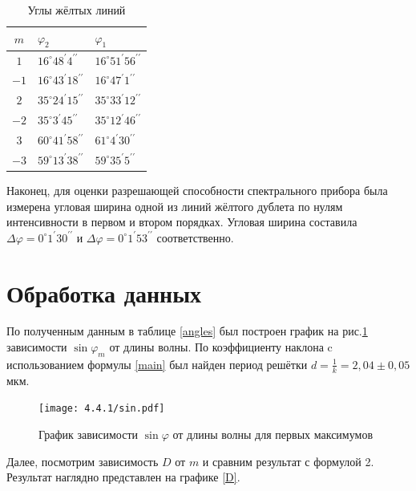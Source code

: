 \documentclass[a4paper,12pt]{article} %
\begin{document}
\begin{table}[H]
    \centering
    \begin{tabular}{|c|p{4cm}|p{4cm}|}
    \hline $m$ & $\varphi_{2}$ & $\varphi_{1}$ \\ \hline
$1$   & $16^{\circ} 48^{\prime}  4^{\prime \prime}$  & $16^{\circ} 51^{\prime} 56^{\prime \prime}$  \\ \hline
$-1$  & $16^{\circ} 43^{\prime} 18^{\prime \prime}$  & $16^{\circ} 47^{\prime} 1^{\prime \prime}$  \\ \hline
$2$   & $35^{\circ} 24^{\prime} 15^{\prime \prime}$  & $35^{\circ} 33^{\prime} 12^{\prime \prime}$  \\ \hline
$-2$  & $35^{\circ}  3^{\prime} 45^{\prime \prime}$  & $35^{\circ} 12^{\prime} 46^{\prime \prime}$  \\ \hline
$3$   & $60^{\circ} 41^{\prime} 58^{\prime \prime}$  & $61^{\circ}  4^{\prime}  30^{\prime \prime}$  \\ \hline
$-3$  & $59^{\circ} 13^{\prime} 38^{\prime \prime}$  & $59^{\circ} 35^{\prime}  5^{\prime \prime}$  \\ \hline
    \end{tabular}
    \caption{Углы жёлтых линий}
    \label{yell}
\end{table}

Наконец, для оценки разрешающей способности спектрального прибора была измерена угловая ширина одной из линий жёлтого дублета по нулям интенсивности в первом и втором порядках. Угловая ширина составила $\Delta \varphi = 0^{\circ} 1^{\prime}  30^{\prime \prime}$ и $ \Delta \varphi = 0^{\circ} 1^{\prime}  53^{\prime \prime}$ соответственно.

\section{Обработка данных}

По полученным данным в таблице \ref{angles} был построен график на рис.\ref{angle} зависимости $\sin \varphi_m$ от длины волны. По коэффициенту наклона c использованием формулы \eqref{main} был найден период решётки $d = \frac{1}{k} = 2,04 \pm 0,05$ мкм.

\begin{figure}[H]
    \centering
    \texttt{[image: 4.4.1/sin.pdf]}
    \caption{График зависимости $\sin \varphi$ от длины волны для первых максимумов}
    \label{angle}
\end{figure}

Далее, посмотрим зависимость $D$ от $m$ и сравним результат с формулой 2. Результат наглядно представлен на графике \ref{D}.
\end{document}
